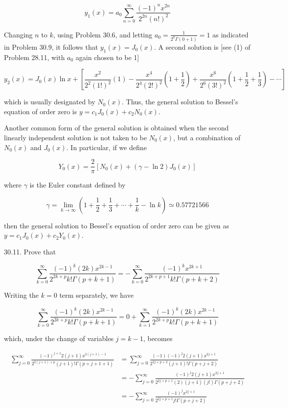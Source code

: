 \documentclass[10pt]{article}
\begin{document}
$$
y_{1}(x)=a_{0} \sum_{n=0}^{\infty} \frac{(-1)^{n} x^{2 n}}{2^{2 n}(n !)^{2}}
$$

Changing $n$ to $k$, using Problem 30.6, and letting $a_{0}=\frac{1}{2^{0} \Gamma(0+1)}=1$ as indicated in Problem 30.9, it follows that $y_{1}(x)=J_{0}(x)$. A second solution is [see (1) of Problem 28.11, with $a_{0}$ again chosen to be 1]

$$
y_{2}(x)=J_{0}(x) \ln x+\left[\frac{x^{2}}{2^{2}(1 !)^{2}}(1)-\frac{x^{4}}{2^{4}(2 !)^{2}}\left(1+\frac{1}{2}\right)+\frac{x^{6}}{2^{6}(3 !)^{2}}\left(1+\frac{1}{2}+\frac{1}{3}\right)-\cdots\right]
$$

which is usually designated by $N_{0}(x)$. Thus, the general solution to Bessel's equation of order zero is $y=c_{1} J_{0}(x)+c_{2} N_{0}(x)$.

Another common form of the general solution is obtained when the second linearly independent solution is not taken to be $N_{0}(x)$, but a combination of $N_{0}(x)$ and $J_{0}(x)$. In particular, if we define


\begin{equation*}
Y_{0}(x)=\frac{2}{\pi}\left[N_{0}(x)+(\gamma-\ln 2) J_{0}(x)\right] \tag{1}
\end{equation*}


where $\gamma$ is the Euler constant defined by

$$
\gamma=\lim _{k \rightarrow \infty}\left(1+\frac{1}{2}+\frac{1}{3}+\cdots+\frac{1}{k}-\ln k\right) \simeq 0.57721566
$$

then the general solution to Bessel's equation of order zero can be given as $y=c_{1} J_{0}(x)+c_{2} Y_{0}(x)$.

30.11. Prove that

$$
\sum_{k=0}^{\infty} \frac{(-1)^{k}(2 k) x^{2 k-1}}{2^{2 k+p} k ! \Gamma(p+k+1)}=-\sum_{k=0}^{\infty} \frac{(-1)^{k} x^{2 k+1}}{2^{2 k+p+1} k ! \Gamma(p+k+2)}
$$

Writing the $k=0$ term separately, we have

$$
\sum_{k=0}^{\infty} \frac{(-1)^{k}(2 k) x^{2 k-1}}{2^{2 k+p} k ! \Gamma(p+k+1)}=0+\sum_{k=1}^{\infty} \frac{(-1)^{k}(2 k) x^{2 k-1}}{2^{2 k+p} k ! \Gamma(p+k+1)}
$$

which, under the change of variables $j=k-1$, becomes

$$
\begin{aligned}
\sum_{j=0}^{\infty} \frac{(-1)^{j+1} 2(j+1) x^{2(j+1)-1}}{2^{2(j+1)+p}(j+1) ! \Gamma(p+j+1+1)} & =\sum_{j=0}^{\infty} \frac{(-1)(-1)^{j} 2(j+1) x^{2 j+1}}{2^{2 j+p+2}(j+1) ! \Gamma(p+j+2)} \\
& =-\sum_{j=0}^{\infty} \frac{(-1)^{j} 2(j+1) x^{2 j+1}}{2^{2 j+p+1}(2)(j+1)(j !) \Gamma(p+j+2)} \\
& =-\sum_{j=0}^{\infty} \frac{(-1)^{j} x^{2 j+1}}{2^{2 j+p+1} j ! \Gamma(p+j+2)}
\end{aligned}
$$
\end{document}
